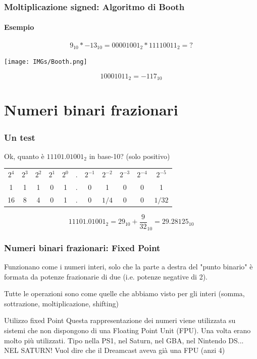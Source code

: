 \documentclass{beamer}
\begin{document}
  \begin{frame}
    \frametitle{Moltiplicazione signed: Algoritmo di Booth}
    \framesubtitle{Esempio}
    $$9_{10} * -13_{10} = 00001001_{2} * 11110011_{2} = ?$$
    \pause
    \begin{center}
    		\texttt{[image: IMGs/Booth.png]}
    \end{center}
    \pause
    \vspace{1em}
    $$10001011_{2} = -117_{10}$$
  \end{frame} 
  
  \section[Fixed]{Numeri binari frazionari}
  \begin{frame}
  		\frametitle{Un test}
  		Ok, quanto è $11101.01001_{2}$ in base-10? (solo positivo)
  		
  		\vspace{2em}
    \pause
		\begin{center}
		\begin{tabular}{ccccccccccc} 
		 $2^4$ & $2^3$ & $2^2$ & $2^1$ & $2^0$ & . & $2^{-1}$ & $2^{-2}$ & $2^{-3}$ & $2^{-4}$ & $2^{-5}$ \\		 
		 1 & 1 & 1 & 0 & 1 & . & 0 & 1 & 0 & 0 & 1 \\ 
		\hline 
		 16 & 8 & 4 & 0 & 1 & . & 0 & $1/4$ & 0 & 0 & $1/32$ \\ 
		\end{tabular}
		\end{center}
		\pause
		\vspace{2em}
		
		$$11101.01001_{2} = 29_{10} + \frac{9}{32}_{10} = 29.28125_{10} $$
  		
  \end{frame}
  \begin{frame}
  		\frametitle{Numeri binari frazionari: Fixed Point}
  		Funzionano come i numeri interi, solo che la parte a destra del "punto binario" è formata
  		da potenze frazionarie di due (i.e. potenze negative di 2).
  		
  		\vspace{2em}
  		
  	  Tutte le operazioni sono come quelle che abbiamo visto per gli interi (somma, sottrazione, moltiplicazione, shifting)
  	  
  	  \vspace{2em}
  	  
  	  \begin{block}{Utilizzo fixed Point}
  	  		Questa rappresentazione dei numeri viene utilizzata su sistemi che non dispongono di una Floating
  	  		Point Unit (FPU). Una volta erano molto più utilizzati. Tipo nella PS1, nel Saturn, nel GBA, nel
  	  		Nintendo DS... NEL SATURN! Vuol dire che il Dreamcast aveva già una FPU (anzi 4)
  	  \end{block}
    
  \end{frame}
\end{document}
